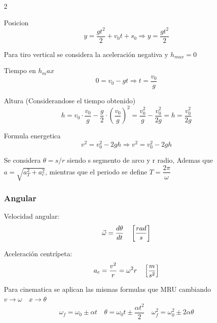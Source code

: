 \documentclass{article}
\begin{document}
\begin{multicols}{2}
\begin{itemform}
                            \item Posicion
                              $$y = \dfrac{gt^2}{2} + v_0 t + s_0\Rightarrow \boxed{y=\dfrac{gt^2}{2}}$$

                            \end{itemform}

                            Para tiro vertical se considera la aceleración negativa y $h_{max}=0$
                            \begin{itemform}
                            \item Tiempo en $h_max$
                              $$0 = v_0 - gt \Rightarrow t = \frac{v_0}{g}$$
                            \item  Altura (Considerandose el tiempo obtenido)
                              $$h = v_0 \cdot \frac{v_0}{g} - \frac{g}{2} \cdot \left( \frac{v_0}{g} \right)^2
                              = \frac{v_0^2}{g} - \frac{v_0^2}{2g} = \boxed{h = \frac{v_0^2}{2g}}$$
                            \item Formula energetica
                              $$  v^2 = v_0^2 - 2g h \Rightarrow \boxed{v^2 = v_0^2 - 2gh}$$

                            \end{itemform}
                            Se considera $\theta=s/r$ siendo s segmento de arco y r radio, Ademas que $a=\sqrt{a_T^2+a_c^2}$, mientras que el periodo se define $T=\dfrac{2\pi}{\omega}$
                            \subsubsection*{Angular}
                            \begin{itemform}
                            \item Velocidad angular:
                              $$\vec{\omega} = \frac{d\theta}{dt} \quad \left[\dfrac{rad}{s} \right]$$
                            \item Aceleración centrípeta:
                              $$a_c = \frac{v^2}{r} = \omega^2 r \quad \left[\dfrac{m}{s^2} \right]$$
                            \end{itemform}
                            Para cinematica se aplican las mismas formulas que MRU cambiando $v\to\omega\quad  x\to \theta$
                            $$\omega_f = \omega_0 \pm \alpha t \quad
                            \theta = \omega_0 t \pm \dfrac{\alpha t^2}{2} \quad
                            \omega_f^2 = \omega_0^2 \pm 2\alpha\theta
                            $$

\end{multicols}
\end{document}
